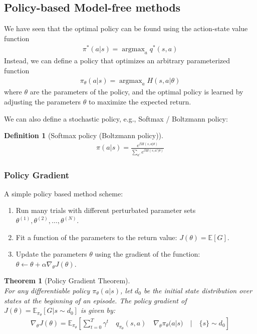 \documentclass[11pt]{book} %
\DeclareMathOperator*{\argmax}{argmax}
\newtheorem{theorem}{Theorem}[section]
\newtheorem{definition}{Definition}[section]
\begin{document}
%
%
%


\subsection{Policy-based Model-free methods}
We have seen that the optimal policy can be found using the action-state value function
\begin{align*}
    \pi^*(a|s) = \argmax_{a} q^{*}(s, a)
\end{align*}
Instead, we can define a policy that optimizes an arbitrary parameterized function 
\begin{align*}
    \pi_\theta(a|s) = \argmax_{a} H(s, a |\theta)
\end{align*}
where $\theta$ are the parameters of the policy,
and the optimal policy is learned by adjusting the parameters $\theta$ to maximize the expected return.

We can also define a stochastic policy, e.g., Softmax / Boltzmann policy:
\begin{definition}[Softmax policy (Boltzmann policy)]\ \\
    \begin{align*}
        \pi(a|s) = \frac{e^{\beta H(s, a |\theta)}}{\sum_{a'} e^{\beta H(s, a' |\theta)}}
    \end{align*} 
\end{definition}





\subsubsection{Policy Gradient}
A simple policy based method scheme:
\begin{enumerate}
    \item Run many trials with different perturbated parameter sets $\theta^{(1)}, \theta^{(2)}, \ldots, \theta^{(N)}$.
    \item Fit a function of the parameters to the return value: $J(\theta) = \mathbb{E}[G]$.
    \item Update the parameters $\theta$ using the gradient of the function: $\theta \leftarrow \theta + \alpha \nabla_{\theta} J(\theta)$.
\end{enumerate}

\begin{theorem}[Policy Gradient Theorem]\ \\
    For any differentiable policy $\pi_{\theta}(a|s)$, let $d_0$ be the initial state distribution over states at the beginning of an episode.
    The policy gradient of $J(\theta) = \mathbb{E}_{\pi_{\theta}}[G | {s} \sim  d_0 ]$ is given by:
    \begin{align*}
        \nabla_{\theta} J(\theta) = 
            \mathbb{E}_{\pi_{\theta}} \left[ \sum_{t=0}^T \gamma^t \quad q_{\pi_{\theta}}(s, a) \quad \nabla_{\theta} \pi_{\theta}(a|s) 
            \quad | \quad \{s\} \sim  d_0 \right]
    \end{align*}    
\end{theorem}
\end{document}
